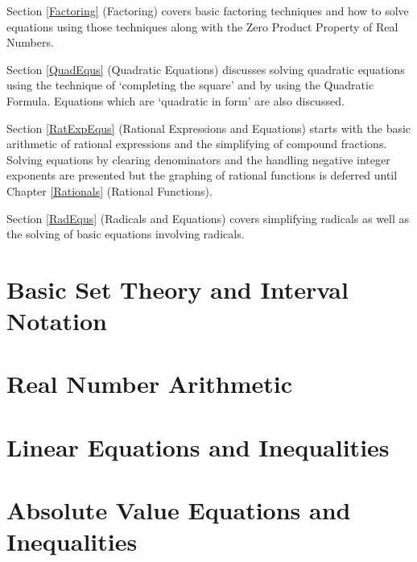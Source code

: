 \smallskip

Section \ref{Factoring} (Factoring) covers basic factoring techniques and how to solve equations using those techniques along with the Zero Product Property of Real Numbers.

\smallskip

Section \ref{QuadEqus} (Quadratic Equations) discusses solving quadratic equations using the technique of `completing the square' and by using the Quadratic Formula.  Equations which are `quadratic in form' are also discussed.

\smallskip

Section \ref{RatExpEqus} (Rational Expressions and Equations) starts with the basic arithmetic of rational expressions and the simplifying of compound fractions.  Solving equations by clearing denominators and the handling negative integer exponents are presented but the graphing of rational functions is deferred until Chapter \ref{Rationals}  (Rational Functions).

\smallskip

Section \ref{RadEqus} (Radicals and Equations) covers simplifying radicals as well as the solving of basic equations involving radicals.  


\newpage

\section{Basic Set Theory and Interval Notation}



\newpage

\section{Real Number Arithmetic}



\newpage

\section{Linear Equations and Inequalities}



\newpage

\section{Absolute Value Equations and Inequalities}

